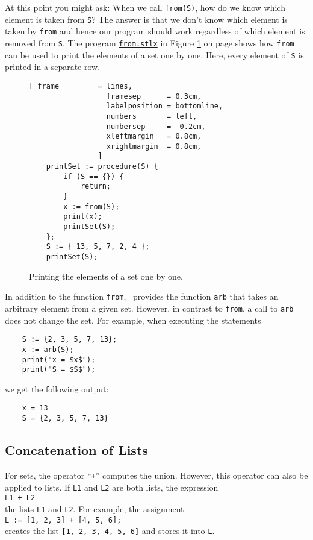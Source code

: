 At this point you might ask: When we call \texttt{from(S)}, how do we
know which element is taken from \texttt{S}?  The answer is that we don't know which element is
taken by \texttt{from} and hence our program should work regardless of which element is removed from
\texttt{S}. The program 
\href{https://github.com/karlstroetmann/Logik/blob/master/SetlX/from.stlx}{\texttt{from.stlx}}
in Figure \ref{fig:from.stlx} on page
\pageref{fig:from.stlx} shows how \texttt{from} can be used to print the elements of a set one by
one.  Here, every element of \texttt{S} is printed in a separate row.


\begin{figure}[!ht]
  \centering
\begin{Verbatim}[ frame         = lines, 
                  framesep      = 0.3cm, 
                  labelposition = bottomline,
                  numbers       = left,
                  numbersep     = -0.2cm,
                  xleftmargin   = 0.8cm,
                  xrightmargin  = 0.8cm,
                ]
    printSet := procedure(S) {
        if (S == {}) {
            return;
        }
        x := from(S);
        print(x);
        printSet(S);
    };
    S := { 13, 5, 7, 2, 4 };
    printSet(S);
\end{Verbatim} 
\vspace*{-0.3cm}
\caption{Printing the elements of a set one by one.}  \label{fig:from.stlx}
\end{figure} 

In addition to the function \texttt{from}, \setlx\ provides the function \texttt{arb} that takes an
arbitrary element from a given set.  However, in contrast to \texttt{from}, a call to \texttt{arb}
does not change the set.  For example, when executing the statements 
\begin{verbatim}
    S := {2, 3, 5, 7, 13};
    x := arb(S);
    print("x = $x$");
    print("S = $S$");
\end{verbatim}
we get the following output:
\begin{verbatim}
    x = 13
    S = {2, 3, 5, 7, 13}
\end{verbatim}

\subsection{Concatenation of Lists}
For sets, the operator ``\texttt{+}'' computes the union.  However, this operator can also be
applied to lists.  If \texttt{L1} and \texttt{L2} are both lists, the expression
\\[0.2cm]
\hspace*{1.3cm}
\texttt{L1 + L2}
\\[0.2cm]
 the lists \texttt{L1} and \texttt{L2}.  For example, the assignment
\\[0.2cm]
\hspace*{1.3cm}
\texttt{L := [1, 2, 3] + [4, 5, 6];}
\\[0.2cm]
creates the list \texttt{[1, 2, 3, 4, 5, 6]} and stores it into \texttt{L}.

